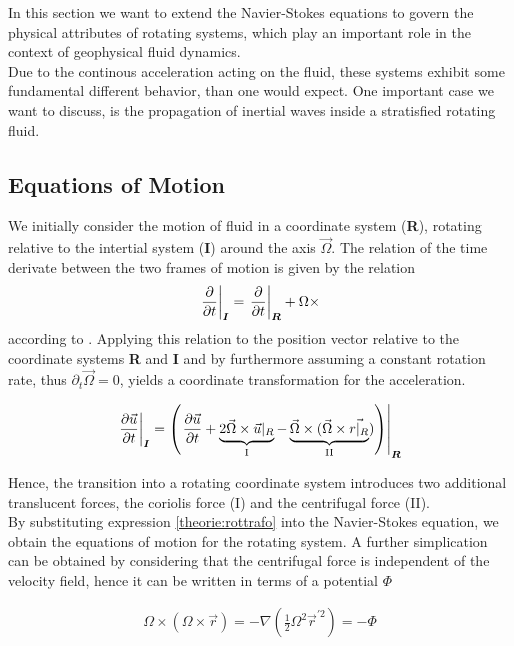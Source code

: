In this section we want to extend the Navier-Stokes equations to govern the physical attributes of rotating systems,
which play an important role in the context of geophysical fluid dynamics.\\
Due to the continous acceleration acting on the fluid, these systems exhibit some fundamental different behavior, than one would expect.
One important case we want to discuss, is the propagation of inertial waves inside a stratisfied rotating fluid.\\

\subsection{Equations of Motion}

We initially consider the motion of fluid in a coordinate system (\textbf{R}), rotating relative to the intertial system (\textbf{I}) around the axis $\vec{\Omega}$.
The relation of the time derivate between the two frames of motion is given by the relation
\begin{align}
    \left.{\pdn[]{t}}\right|_{\bm{I}} = \left.\pdn[]{t}\right|_{\bm{R}} + \Omega \times
\end{align}
according to \citep{Tilgner2007}.
Applying this relation to the position vector relative to the coordinate systems \textbf{R} and \textbf{I}
and by furthermore assuming a constant rotation rate, thus $\partial_t\vec{\Omega} = 0$, yields a coordinate transformation for the acceleration.

\begin{align}
    \label{theorie:rottrafo}
    \left.\pdn[\vec{u}]{t}\right|_{\bm{I}} = \left(\left.\pdn[\vec{u}]{t}  + \underbrace{2\vec{\Omega} \times \vec{u}|_R}_{\text{I}}
    - \underbrace{\vec{\Omega} \times (\vec{\Omega} \times \vec{r|_R}}_{\text{II}})\right)\right|_{\bm{R}}
\end{align}

Hence, the transition into a rotating coordinate system introduces two additional translucent forces, the coriolis force (I)  and the centrifugal force (II).\\
By substituting expression \ref{theorie:rottrafo} into the Navier-Stokes equation, we obtain the equations of motion for the rotating system.
A further simplication can be obtained by considering that the centrifugal force is independent of the velocity field,
hence it can be written in terms of a potential $\Phi$

\begin{align}
    \Omega \times (\Omega \times \vec{r}) = - \nabla \left(\frac{1}{2}\Omega^2\vec{r}^{'2}\right) = -\Phi
\end{align}

